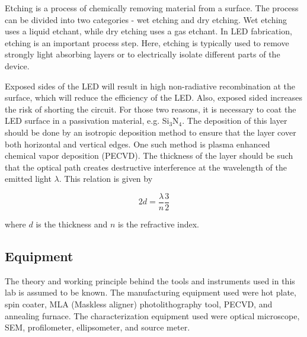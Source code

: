 Etching is a process of chemically removing material from a surface. 
The process can be divided into two categories -  wet etching and dry etching.
Wet etching uses a liquid etchant, while dry etching uses a gas etchant.
In LED fabrication, etching is an important process step.
Here, etching is typically used to remove strongly light absorbing layers or to electrically isolate different parts of the device.

Exposed sides of the LED will result in high non-radiative recombination at the surface, which will reduce the efficiency of the LED.
Also, exposed sided increases the risk of shorting the circuit.
For those two reasons, it is necessary to coat the LED surface in a passivation material, e.g. Si$_3$N$_4$.
The deposition of this layer should be done by an isotropic deposition method to ensure that the layer cover both horizontal and vertical edges.
One such method is plasma enhanced chemical vapor deposition (PECVD).
The thickness of the layer should be such that the optical path creates destructive interference at the wavelength of the emitted light $\lambda$.
This relation is given by

\begin{equation}
    \label{eq:thickness}
    2d = \frac{\lambda}{n} \frac{3}{2}
\end{equation}

where $d$ is the thickness and $n$ is the refractive index.

\subsection{Equipment}
\label{Equipment}

\noindent The theory and working principle behind the tools and instruments used in this lab is assumed to be known.
The manufacturing equipment used were hot plate, spin coater, MLA (Maskless aligner) photolithography tool, PECVD, and annealing furnace.
The characterization equipment used were optical microscope, SEM, profilometer, ellipsometer, and source meter.
